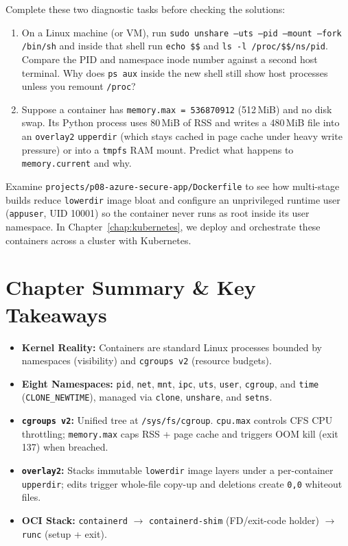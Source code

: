 \begin{tryityourselfbox}
Complete these two diagnostic tasks before checking the solutions:
\begin{enumerate}[leftmargin=12pt]
  \item On a Linux machine (or VM), run \texttt{sudo unshare --uts --pid --mount --fork /bin/sh} and inside that shell run \texttt{echo \$\$} and \texttt{ls -l /proc/\$\$/ns/pid}. Compare the PID and namespace inode number against a second host terminal. Why does \texttt{ps aux} inside the new shell still show host processes unless you remount \texttt{/proc}?
  \item Suppose a container has \texttt{memory.max = 536870912} (512\,MiB) and no disk swap. Its Python process uses 80\,MiB of RSS and writes a 480\,MiB file into an \texttt{overlay2} \texttt{upperdir} (which stays cached in page cache under heavy write pressure) or into a \texttt{tmpfs} RAM mount. Predict what happens to \texttt{memory.current} and why.
\end{enumerate}
\end{tryityourselfbox}

\begin{labbridgebox}
Examine \texttt{projects/p08-azure-secure-app/Dockerfile} to see how multi-stage builds reduce \texttt{lowerdir} image bloat and configure an unprivileged runtime user (\texttt{appuser}, UID 10001) so the container never runs as root inside its user namespace. In Chapter~\ref{chap:kubernetes}, we deploy and orchestrate these containers across a cluster with Kubernetes.
\end{labbridgebox}

\section{Chapter Summary \protect\& Key Takeaways}
\begin{itemize}[leftmargin=15pt]
  \item \textbf{Kernel Reality:} Containers are standard Linux processes bounded by namespaces (visibility) and \texttt{cgroups v2} (resource budgets).
  \item \textbf{Eight Namespaces:} \texttt{pid}, \texttt{net}, \texttt{mnt}, \texttt{ipc}, \texttt{uts}, \texttt{user}, \texttt{cgroup}, and \texttt{time} (\texttt{CLONE\_NEWTIME}), managed via \texttt{clone}, \texttt{unshare}, and \texttt{setns}.
  \item \textbf{\texttt{cgroups v2}:} Unified tree at \texttt{/sys/fs/cgroup}. \texttt{cpu.max} controls CFS CPU throttling; \texttt{memory.max} caps RSS + page cache and triggers OOM kill (exit 137) when breached.
  \item \textbf{\texttt{overlay2}:} Stacks immutable \texttt{lowerdir} image layers under a per-container \texttt{upperdir}; edits trigger whole-file copy-up and deletions create \texttt{0,0} whiteout files.
  \item \textbf{OCI Stack:} \texttt{containerd} $\to$ \texttt{containerd-shim} (FD/exit-code holder) $\to$ \texttt{runc} (setup + exit).
\end{itemize}

